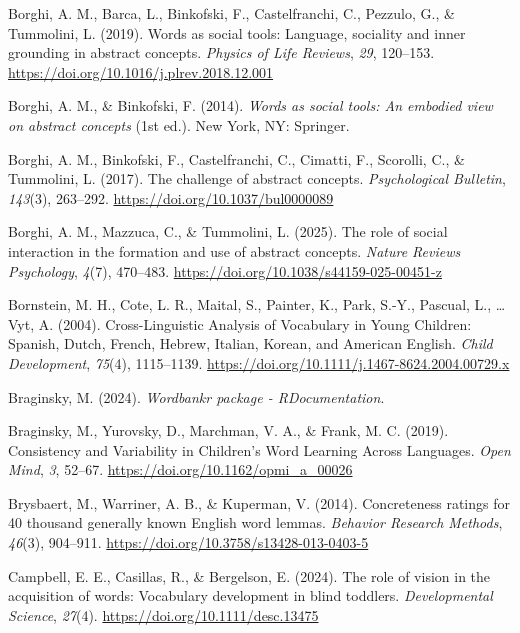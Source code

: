 \documentclass[
  man,floatsintext]{apa6}
\newlength{\cslhangindent}
\newenvironment{CSLReferences}[2] %
 {\begin{list}{}{%
  \setlength{\itemindent}{0pt}
  \setlength{\leftmargin}{0pt}
  \setlength{\parsep}{0pt}
  \ifodd #1
   \setlength{\leftmargin}{\cslhangindent}
   \setlength{\itemindent}{-1\cslhangindent}
  \fi
  \setlength{\itemsep}{#2\baselineskip}}}
 {\end{list}}
\begin{document}
\begin{CSLReferences}{1}{0}
Borghi, A. M., Barca, L., Binkofski, F., Castelfranchi, C., Pezzulo, G., \& Tummolini, L. (2019). Words as social tools: {Language}, sociality and inner grounding in abstract concepts. \emph{Physics of Life Reviews}, \emph{29}, 120--153. \url{https://doi.org/10.1016/j.plrev.2018.12.001}

Borghi, A. M., \& Binkofski, F. (2014). \emph{Words as social tools: {An} embodied view on abstract concepts} (1st ed.). New York, NY: Springer.

Borghi, A. M., Binkofski, F., Castelfranchi, C., Cimatti, F., Scorolli, C., \& Tummolini, L. (2017). The challenge of abstract concepts. \emph{Psychological Bulletin}, \emph{143}(3), 263--292. \url{https://doi.org/10.1037/bul0000089}

Borghi, A. M., Mazzuca, C., \& Tummolini, L. (2025). The role of social interaction in the formation and use of abstract concepts. \emph{Nature Reviews Psychology}, \emph{4}(7), 470--483. \url{https://doi.org/10.1038/s44159-025-00451-z}

Bornstein, M. H., Cote, L. R., Maital, S., Painter, K., Park, S.-Y., Pascual, L., \ldots{} Vyt, A. (2004). Cross-{Linguistic Analysis} of {Vocabulary} in {Young Children}: {Spanish}, {Dutch}, {French}, {Hebrew}, {Italian}, {Korean}, and {American English}. \emph{Child Development}, \emph{75}(4), 1115--1139. \url{https://doi.org/10.1111/j.1467-8624.2004.00729.x}

Braginsky, M. (2024). \emph{Wordbankr package - {RDocumentation}}.

Braginsky, M., Yurovsky, D., Marchman, V. A., \& Frank, M. C. (2019). Consistency and {Variability} in {Children}'s {Word Learning Across Languages}. \emph{Open Mind}, \emph{3}, 52--67. \url{https://doi.org/10.1162/opmi_a_00026}

Brysbaert, M., Warriner, A. B., \& Kuperman, V. (2014). Concreteness ratings for 40 thousand generally known {English} word lemmas. \emph{Behavior Research Methods}, \emph{46}(3), 904--911. \url{https://doi.org/10.3758/s13428-013-0403-5}

Campbell, E. E., Casillas, R., \& Bergelson, E. (2024). The role of vision in the acquisition of words: {Vocabulary} development in blind toddlers. \emph{Developmental Science}, \emph{27}(4). \url{https://doi.org/10.1111/desc.13475}


\end{CSLReferences}
\end{document}
